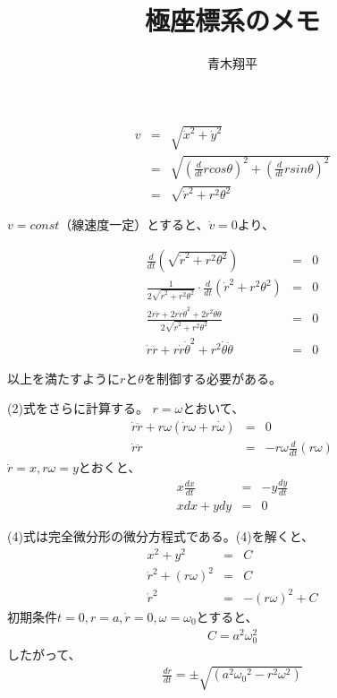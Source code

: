 \documentclass{article}
\title{極座標系のメモ}
\author{青木翔平}
\begin{document}
\maketitle

\begin{eqnarray}
v &=& \sqrt{\dot{x}^2 + \dot{y}^2} \nonumber \\
  &=& \sqrt{ \left(\frac{d}{dt} r cos\theta \right) ^2 + \left(\frac{d}{dt}r sin\theta\right) ^2} \nonumber \\
  &=& \sqrt{ \dot{r}^2+ r^2 \theta^2 } 
\end{eqnarray}	
	
$v=const$（線速度一定）とすると、$\dot{v} = 0$より、
	
\begin{eqnarray}
	\frac{d}{dt} \left(\sqrt{ \dot{r}^2+ r^2 \theta^2 } \right) &=& 0 \nonumber \\
\frac{1}{2\sqrt{ \dot{r}^2+ r^2 \theta^2 }} \cdot \frac{d}{dt}\left( \dot{r}^2+r^2 \theta^2 \right) &=& 0 \nonumber \\ 
\frac{2\dot{r}\ddot{r} + 2r\dot{r}\dot{\theta}^2 + 2r^2\dot{\theta}\ddot{\theta}}{2\sqrt{ \dot{r}^2+ r^2 \theta^2 }} &=& 0 \nonumber \\
\dot{r}\ddot{r} + r\dot{r}\dot{\theta}^2 + r^2\dot{\theta}\ddot{\theta} &=& 0  
\end{eqnarray}
	
以上を満たすように$r$と$\theta$を制御する必要がある。
	
(2)式をさらに計算する。
$r=\omega$とおいて、
\begin{eqnarray}
  \dot{r}\ddot{r}+r\omega(\dot{r}\omega+r\dot{\omega})&=&0 \nonumber \\
  \dot{r}\ddot{r} &=& -r\omega\frac{d}{dt}(r\omega) 
\end{eqnarray}
$\dot{r}=x, r\omega=y$とおくと、
\begin{eqnarray}
  x\frac{dx}{dt} &=& -y\frac{dy}{dt} \nonumber \\
  xdx + ydy &=& 0	
\end{eqnarray}

(4)式は完全微分形の微分方程式である。(4)を解くと、
\begin{eqnarray}
  x^2+y^2 &=& C  \nonumber \\
  \dot{r}^2 + (r\omega)^2 &=& C \nonumber \\
  \dot{r}^2 &=& -(r\omega)^2 + C 	
\end{eqnarray}
初期条件$t=0, r=a, \dot{r}=0, \omega=\omega_0$とすると、
\begin{eqnarray*}
  C=a^2\omega_0^2	
\end{eqnarray*}
したがって、
\begin{eqnarray}
\frac{dr}{dt} = \pm \sqrt{\left( a^2 {\omega_0}^2 - r^2 \omega^2 \right)}	
\end{eqnarray}
\end{document}
